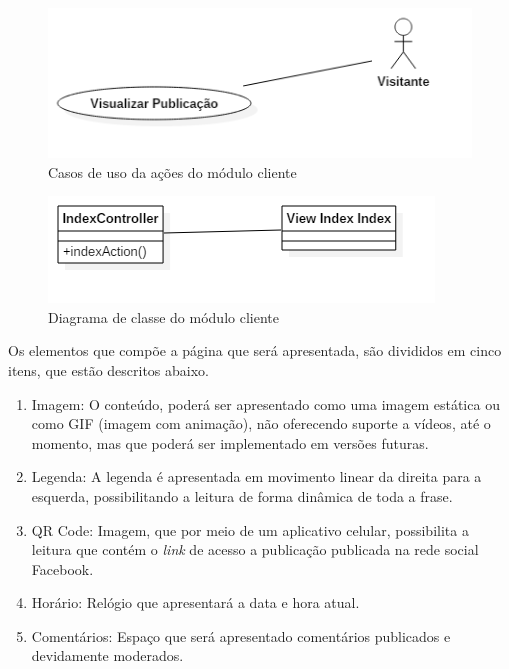 \begin{figure}[H]
\centering
\includegraphics[scale=0.6]{figuras/casosDeUsoCliente}
\caption{Casos de uso da ações do módulo cliente}
\label{fig:casosDeUsoCliente}
\end{figure} 

\begin{figure}[H]
\centering
\includegraphics[scale=0.4]{figuras/diagramaclasseCLIENTE}
\caption{Diagrama de classe do módulo cliente}
\label{fig:diagramaclasseCLIENTE}
\end{figure}

Os elementos que compõe a página que será apresentada, são divididos em cinco itens, que estão descritos abaixo.

\begin{enumerate}
   \item Imagem: O conteúdo, poderá ser apresentado como uma imagem estática ou como GIF (imagem com animação), não oferecendo suporte a vídeos, até o momento, mas que poderá ser implementado em versões futuras. 
   \item Legenda: A legenda é apresentada em movimento linear da direita para a esquerda, possibilitando a leitura de forma dinâmica de toda a frase.
   \item QR Code: Imagem, que por meio de um aplicativo celular, possibilita a leitura que contém o \textit{link} de acesso a publicação publicada na rede social Facebook.
   \item Horário: Relógio que apresentará a data e hora atual.  
   \item Comentários: Espaço que será apresentado comentários publicados e devidamente moderados.
 \end{enumerate}
  

